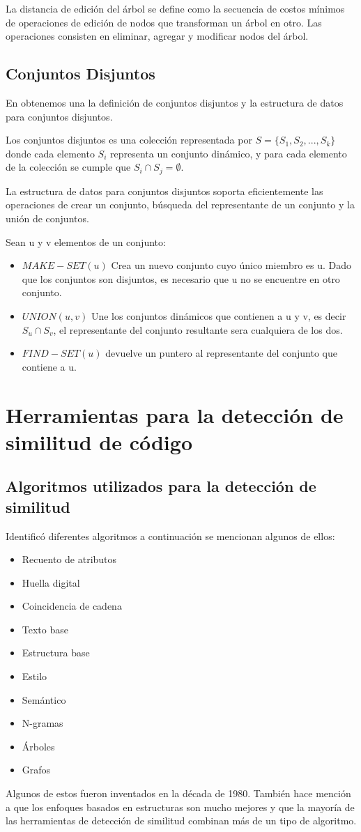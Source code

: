 La distancia de edición del árbol se define como la secuencia de costos mínimos de operaciones de edición de nodos que transforman un árbol en otro. Las operaciones consisten en eliminar, agregar y modificar nodos del árbol.

\subsection{Conjuntos Disjuntos}
En \cite{Cormen2009} obtenemos una la definición de conjuntos disjuntos y la estructura de datos para conjuntos disjuntos.

Los conjuntos disjuntos es una colección representada por $S=\{ S_1,S_2,...,S_k \}$ donde cada elemento $S_i$ representa un conjunto dinámico, y para cada elemento de la colección se cumple que $S_i \cap S_j = \emptyset$.

La estructura de datos para conjuntos disjuntos soporta eficientemente las operaciones de crear un conjunto, búsqueda del representante de un conjunto y la unión de conjuntos.

\noindent Sean u y v elementos de un conjunto:
\begin{itemize}
    \item $MAKE-SET(u)$ Crea un nuevo conjunto cuyo único miembro es u. Dado que los conjuntos son disjuntos, es necesario que u no se encuentre en otro conjunto.
    \item $UNION(u, v)$ Une los conjuntos dinámicos que contienen a u y v, es decir $S_u \cap S_v$, el representante del conjunto resultante sera cualquiera de los dos.
    \item $FIND-SET(u)$ devuelve un puntero al representante del conjunto que contiene a u.
\end{itemize}

\section{Herramientas para la detección de similitud de código}
\subsection{Algoritmos utilizados para la detección de similitud}
\cite{10.1145/3313290} Identificó diferentes algoritmos a continuación se mencionan algunos de ellos:
\begin{itemize}
    \item Recuento de atributos
    \item Huella digital
    \item Coincidencia de cadena
    \item Texto base
    \item Estructura base
    \item Estilo
    \item Semántico
    \item N-gramas
    \item Árboles
    \item Grafos
\end{itemize}
Algunos de estos fueron inventados en la década de 1980. También hace mención a que los enfoques basados en estructuras son mucho mejores y que la mayoría de las herramientas de detección de similitud combinan más de un tipo de algoritmo.
